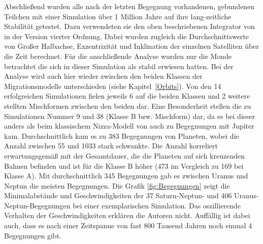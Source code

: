 \documentclass[12pt,a4paper,twoside]{article}
\renewcommand{\cite}{\citep}
\newcommand{\refsec}[1]{siehe Kapitel~\ref{#1}}
\begin{document}
Abschließend wurden alle nach der letzten Begegnung vorhandenen, gebundenen Teilchen mit einer Simulation über 1 Million Jahre auf ihre lang-zeitliche Stabilität getestet. Dazu verwendeten sie den oben beschriebenen Integrator von \cite{Wisdom1991} in der Version vierter Ordnung.
Dabei wurden zugleich die Durchschnittswerte von Großer Halbachse, Exzentrizität und Inklination der einzelnen Satelliten über die Zeit berechnet.
Für die anschließende Analyse wurden nur die Monde betrachtet die sich in dieser Simulation als stabil erwiesen hatten\cite{Nesvorny2007}.
Bei der Analyse wird auch hier wieder zwischen den beiden Klassen der Migrationsmodelle unterschieden (\refsec{Orbits}).
Von den 14 erfolgreichen Simulationen fielen jeweils 6 auf die beiden Klassen und 2 weitere stellten Mischformen zwischen den beiden dar. Eine Besonderheit stellen die zu Simulationen Nummer 9 und 38 (Klasse B bzw. Mischform) dar, da es bei dieser anders als beim klassischem Nizza-Modell von \cite{Tsiganis2005} auch zu Begegnungen mit Jupiter kam.
Durchschnittlich kam es zu 383 Begegnungen von Planeten, wobei die Anzahl zwischen 55 und 1033 stark schwankte.
Die Anzahl korreliert erwartungsgemäß mit der Gesamtdauer, die die Planeten auf sich kreuzenden Bahnen befinden und ist für die Klasse B höher (473 im Vergleich zu 169 bei Klasse A).
Mit durchschnittlich 345 Begegnungen gab es zwischen Uranus und Neptun die meisten Begegnungen\cite{Nesvorny2007}. %
Die Grafik \ref{fig:Begegnungen} zeigt die Minimalabstände und Geschwindigkeiten der 37 Saturn-Neptun- und 406 Uranus-Neptun-Begegnungen bei einer exemplarischen Simulation.
Das oszillierende Verhalten der Geschwindigkeiten erklären die Autoren nicht.
Auffällig ist dabei auch, dass es nach einer Zeitspanne von fast 800 Tausend Jahren noch einmal 4 Begegnungen gibt\cite{Nesvorny2007}.
\end{document}
